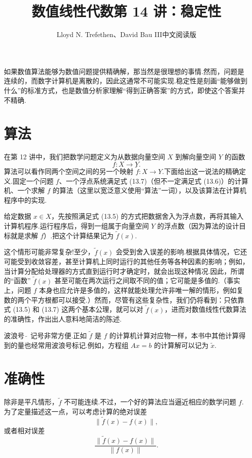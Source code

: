 \documentclass[UTF8,fontset=none,12pt]{ctexart}
\title{数值线性代数\quad 第 14 讲：稳定性}
\author{Lloyd N. Trefethen、David Bau III\quad 中文阅读版}
\date{}
\theoremstyle{definition}
\begin{document}
\maketitle
\pagestyle{plain}

如果数值算法能够为数值问题提供精确解，那当然是很理想的事情.然而，问题是连续的，而数字计算机是离散的，因此这通常不可能实现.稳定性是刻画“能够做到什么”的标准方式，也是数值分析家理解“得到正确答案”的方式，即使这个答案并不精确.

\section*{算法}

在第 12 讲中，我们把数学问题定义为从数据向量空间 $X$ 到解向量空间 $Y$ 的函数
\[
    f:X\to Y.
\]
算法可以看作同两个空间之间的另一个映射 $\widetilde f:X\to Y$.下面给出这一说法的精确定义.固定一个问题 $f$、一个浮点系统满足式 (13.7)（但不一定满足式 (13.6)）的计算机、一个求解 $f$ 的算法（这里以宽泛意义使用“算法”一词），以及该算法在计算机程序中的实现.

给定数据 $x\in X$，先按照满足式 (13.5) 的方式把数据舍入为浮点数，再将其输入计算机程序.运行程序后，得到一组属于向量空间 $Y$ 的浮点数（因为算法的设计目标就是求解 $f$）.把这个计算结果记为 $\widetilde f(x)$.

这个情形可能非常复杂!至少，$\widetilde f(x)$ 会受到舍入误差的影响.根据具体情况，它还可能受到收敛容差，甚至计算机上同时运行的其他任务等各种因素的影响；例如，当计算分配给处理器的方式直到运行时才确定时，就会出现这种情况.因此，所谓的“函数” $\widetilde f(x)$ 甚至可能在两次运行之间取不同的值；它可能是多值的.（事实上，问题 $f$ 本身也应允许是多值的，这样就能处理允许非唯一解的情形，例如复数的两个平方根都可以接受.）然而，尽管有这些复杂性，我们仍将看到：只依靠式 (13.5) 和 (13.7) 这两个基本公理，就可以对 $\widetilde f(x)$，进而对数值线性代数算法的准确性，作出出人意料地简洁的陈述.

波浪号 $\widetilde{\ }$ 记号非常方便.正如 $\widetilde f$ 是 $f$ 的计算机计算对应物一样，本书中其他计算得到的量也经常用波浪号标记.例如，方程组 $Ax=b$ 的计算解可以记为 $\widetilde x$.

\section*{准确性}

除非是平凡情形，$\widetilde f$ 不可能连续.不过，一个好的算法应当逼近相应的数学问题 $f$.为了定量描述这一点，可以考虑计算的绝对误差
\[
    \|\widetilde f(x)-f(x)\|,
\]
或者相对误差
\begin{equation}
    \frac{\|\widetilde f(x)-f(x)\|}{\|f(x)\|}.
    \tag{14.1}
\end{equation}
\end{document}
